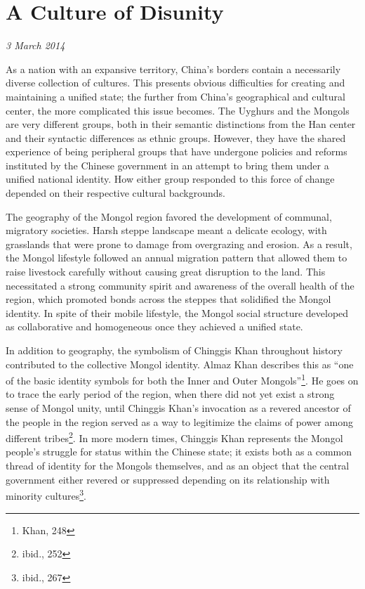 \section{A Culture of Disunity}

\textit{3 March 2014}

As a nation with an expansive territory, China's borders contain a necessarily
diverse collection of cultures. This presents obvious difficulties for creating
and maintaining a unified state; the further from China's geographical and
cultural center, the more complicated this issue becomes. The Uyghurs and the
Mongols are very different groups, both in their semantic distinctions from the
Han center and their syntactic differences as ethnic groups.  However, they have
the shared experience of being peripheral groups that have undergone policies
and reforms instituted by the Chinese government in an attempt to bring them
under a unified national identity. How either group responded to this force of
change depended on their respective cultural backgrounds.

The geography of the Mongol region favored the development of communal,
migratory societies. Harsh steppe landscape meant a delicate ecology, with
grasslands that were prone to damage from overgrazing and erosion. As a result,
the Mongol lifestyle followed an annual migration pattern that allowed them to
raise livestock carefully without causing great disruption to the land. This
necessitated a strong community spirit and awareness of the overall health of
the region, which promoted bonds across the steppes that solidified the Mongol
identity. In spite of their mobile lifestyle, the Mongol social structure
developed as collaborative and homogeneous once they achieved a unified state.

In addition to geography, the symbolism of Chinggis Khan throughout history
contributed to the collective Mongol identity.  Almaz Khan describes this as
``one of the basic identity symbols for both the Inner and Outer
Mongols''\footnote{Khan, 248}. He goes on to trace the early period of the
region, when there did not yet exist a strong sense of Mongol unity, until
Chinggis Khan's invocation as a revered ancestor of the people in the region
served as a way to legitimize the claims of power among different
tribes\footnote{ibid., 252}. In more modern times, Chinggis Khan represents the
Mongol people's struggle for status within the Chinese state; it exists both as
a common thread of identity for the Mongols themselves, and as an object that
the central government either revered or suppressed depending on its
relationship with minority cultures\footnote{ibid., 267}.

